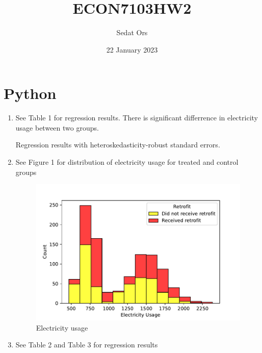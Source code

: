 \documentclass{article}
\title{ECON7103HW2}
\author{Sedat Ors}
\date{22 January 2023}
\begin{document}
\maketitle

\section{Python}
\vspace{0.5cm}
\begin{enumerate}
\item
\noindent See Table 1 for regression results. There is significant differrence in electricity usage between two groups.
\vspace{0.5cm}
\begin{table}[]
    \centering
    
    \caption{Regression results with heteroskedasticity-robust standard errors.}
    \label{tab:question3}
\end{table}

\item 
\noindent See Figure 1 for distribution of electricity usage for treated and control groups
\vspace{0.5cm}
\begin{figure}[]
    \centering
     \includegraphics{histogram.pdf}
    \caption{Electricity usage}
    \label{tab:question3}
\end{figure}

\item 
\noindent See Table 2 and Table 3 for regression results
 \begin{table}[]
    \centering
    
    \caption{}
    \label{tab:question3}
\end{table}

\vspace{0.5cm}
\begin{table}[]
    \centering
    
    \caption{}
    \label{tab:question3}
\end{table}
\end{enumerate}
\end{document}

